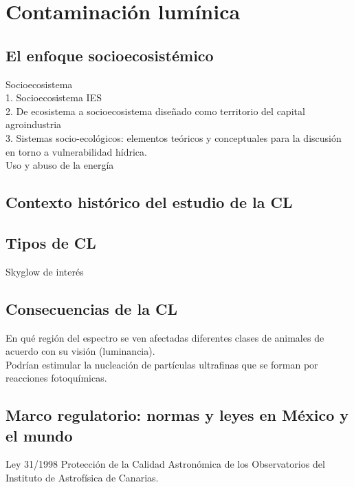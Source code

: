\section{Contaminación lumínica}

\subsection{El enfoque socioecosistémico}

Socioecosistema\\

1. Socioecosistema IES\\

2. De ecosistema a socioecosistema diseñado
como territorio del capital agroindustria\\

3. Sistemas socio-ecológicos: elementos teóricos y conceptuales para la discusión en torno a vulnerabilidad hídrica.\\

Uso y abuso de la energía\\

\subsection{Contexto histórico del estudio de la CL}

\subsection{Tipos de CL}

Skyglow de interés

\subsection{Consecuencias de la CL}

En qué región del espectro se ven afectadas diferentes clases de animales de acuerdo con su visión (luminancia).\\

Podrían estimular la nucleación de partículas ultrafinas que se forman por reacciones fotoquímicas.

\subsection{Marco regulatorio: normas y leyes en México y el mundo}

Ley 31/1998 Protección de la Calidad Astronómica de los Observatorios del Instituto de Astrofísica de Canarias.\\

